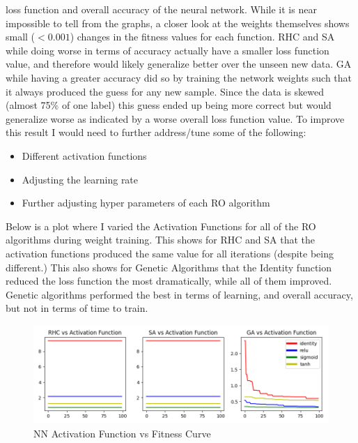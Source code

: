 \documentclass[11pt]{article}
\begin{document}
    loss function and overall accuracy of the neural network.
    While it is near impossible to tell from the graphs, a closer look at the weights themselves shows small ($< 0.001$)
    changes in the fitness values for each function.
    RHC and SA while doing worse in terms of accuracy actually have a smaller loss function value, and therefore would likely
    generalize better over the unseen new data.
    GA while having a greater accuracy did so by training the network weights such that it always produced the guess for
    any new sample.
    Since the data is skewed (almost 75\% of one label) this guess ended up being more correct but would generalize worse
    as indicated by a worse overall loss function value.
    To improve this result I would need to further address/tune some of the following:
    \begin{itemize}
        \item Different activation functions
        \item Adjusting the learning rate
        \item Further adjusting hyper parameters of each RO algorithm
    \end{itemize}
    Below is a plot where I varied the Activation Functions for all of the RO algorithms during weight training.
    This shows for RHC and SA that the activation functions produced the same value for all iterations (despite being different.)
    This also shows for Genetic Algorithms that the Identity function reduced the loss function the most dramatically, while
    all of them improved.
    Genetic algorithms performed the best in terms of learning, and overall accuracy, but not in terms of time to train.
    \begin{figure}
        \begin{center}
            \includegraphics[width=1\linewidth]{nnactfunc.png}
            \caption{NN Activation Function vs Fitness Curve}\label{Fig:NN Activation Function vs Fitness Curve}
        \end{center}
    \end{figure}
    \pagebreak
    
    
\end{document}
